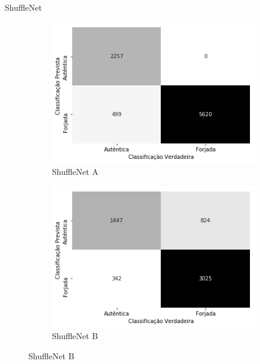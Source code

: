 \begin{frame}{ShuffleNet}
  \baselineskip
  \begin{figure}[ht!]
    \caption{Matrizes de confusão dos modelos obtidos com a arquitetura ShuffleNet.}\label{fig:matrizes-lenet}
    \begin{subfigure}{0.4\linewidth}
      \caption{ShuffleNet A}
      \includegraphics[width=\linewidth]{img/matriz-shufflenet-a}
    \end{subfigure}
    \hspace{2cm}
    \begin{subfigure}{0.4\linewidth}
      \caption{ShuffleNet B}
      \includegraphics[width=\linewidth]{img/matriz-shufflenet-b}%
    \end{subfigure}
\end{figure}
\end{frame}

